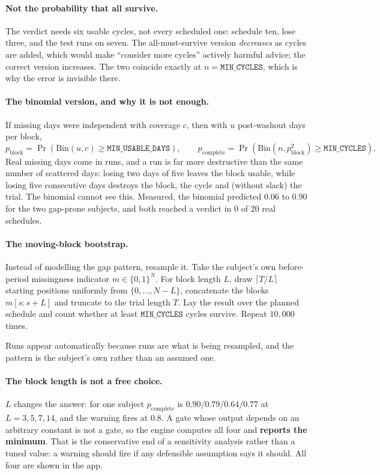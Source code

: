 \documentclass{article}
\theoremstyle{plain}
\theoremstyle{definition}
\theoremstyle{remark}
\numberwithin{equation}{section}
\begin{document}
\paragraph{Not the probability that all survive.} The verdict needs six usable
cycles, not every scheduled one: schedule ten, lose three, and the test runs on
seven. The all-must-survive version \emph{decreases} as cycles are added, which
would make ``consider more cycles'' actively harmful advice; the correct version
increases. The two coincide exactly at $n = \texttt{MIN\_CYCLES}$, which is why
the error is invisible there.

\paragraph{The binomial version, and why it is not enough.} If missing days
were independent with coverage $c$, then with $u$ post-washout days per block,
\[
  p_{\mathrm{block}} = \Pr(\mathrm{Bin}(u,c) \ge \texttt{MIN\_USABLE\_DAYS}),
  \qquad
  p_{\mathrm{complete}} = \Pr\!\left(\mathrm{Bin}(n, p_{\mathrm{block}}^2) \ge \texttt{MIN\_CYCLES}\right).
\]
Real missing days come in runs, and a run is far more destructive than the same
number of scattered days: losing two days of five leaves the block usable,
while losing five consecutive days destroys the block, the cycle and (without
slack) the trial. The binomial cannot see this. Measured, the binomial
predicted $0.06$ to $0.90$ for the two gap-prone subjects, and both reached a
verdict in $0$ of $20$ real schedules.

\paragraph{The moving-block bootstrap.} Instead of modelling the gap pattern,
resample it. Take the subject's own before-period missingness indicator
$m \in \{0,1\}^{N}$. For block length $L$, draw $\lceil T/L \rceil$ starting
positions uniformly from $\{0,\dots,N-L\}$, concatenate the blocks $m[s:s+L]$
and truncate to the trial length $T$. Lay the result over the planned schedule
and count whether at least $\texttt{MIN\_CYCLES}$ cycles survive. Repeat
$10{,}000$ times.

Runs appear automatically because runs are what is being resampled, and the
pattern is the subject's own rather than an assumed one.

\paragraph{The block length is not a free choice.} $L$ changes the answer: for
one subject $p_{\mathrm{complete}}$ is $0.90 / 0.79 / 0.64 / 0.77$ at
$L = 3,5,7,14$, and the warning fires at $0.8$. A gate whose output depends on
an arbitrary constant is not a gate, so the engine computes all four and
\textbf{reports the minimum}. That is the conservative end of a sensitivity
analysis rather than a tuned value: a warning should fire if any defensible
assumption says it should. All four are shown in the app.
\end{document}
